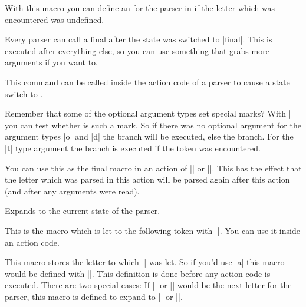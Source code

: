 \begin{command}{\pgfparserdefunknown{}}%
  With this macro you can define an  for the %
  parser in  if the letter which was encountered was undefined.
\end{command}%

\begin{command}{\pgfparserdeffinal{}}%
  Every parser can call a final  after the state was switched to
  |final|. This  is executed after everything else, so you can use
  something that grabs more arguments if you want to.
\end{command}%

\begin{command}{\pgfparserswitch{}}%
  This command can be called inside the action code of a parser to cause a
  state switch to .
\end{command}%

\begin{command}{\pgfparserifmark{}}%
  Remember that some of the optional argument types set special marks? With
  |\pgfparserifmark| you can test whether  is such a mark. So if
  there was no optional argument for the argument types |o| and |d| the
   branch will be executed, else the  branch. For the |t|
  type argument the  branch is executed if the token was encountered.
\end{command}%

\begin{command}{\pgfparserreinsert}%
  You can use this as the final macro in an action of |\pgfparserdef| or
  |\pgfparserdefunknown|. This has the effect that the letter which was parsed
  in this action will be parsed again after this action (and after any arguments
  were read).
\end{command}%

\begin{command}{\pgfparserstate}%
  Expands to the current state of the parser.
\end{command}%

\begin{command}{\pgfparsertoken}%
  This is the macro which is let to the following token with |\futurelet|. You
  can use it inside an action code.
\end{command}%

\begin{command}{\pgfparserletter}%
  This macro stores the letter to which |\pgfparsertoken| was let. So if
  you'd use |a| this macro would be defined with
  |\def\pgfparserletter{a}|. This definition is done before any action code is
  executed. There are two special cases: If |{| or |}| would be the next letter
  for the parser, this macro is defined to expand to |\bgroup| or |\egroup|.
\end{command}%

